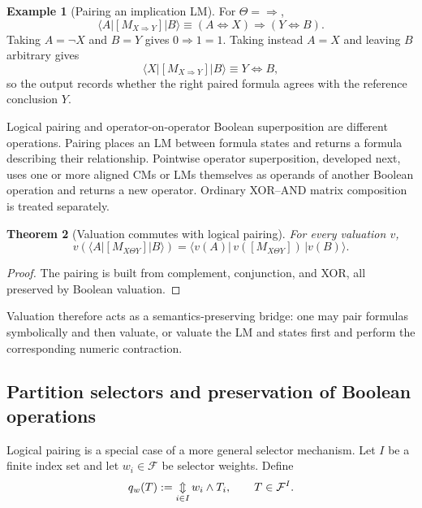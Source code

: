 \documentclass[11pt]{article}
\newtheorem{theorem}{Theorem}[section]
\theoremstyle{definition}
\newtheorem{example}[theorem]{Example}
\theoremstyle{remark}
\newcommand{\cF}{\mathcal F}
\newcommand{\bigxor}{\mathop{\Updownarrow}\displaylimits}
\begin{document}
\begin{example}[Pairing an implication LM]
For $\Theta=\Rightarrow$,
\[
 \langle A|[M_{X\Rightarrow Y}]|B\rangle
 \equiv (A\Leftrightarrow X)\Rightarrow(Y\Leftrightarrow B).
\]
Taking $A=\neg X$ and $B=Y$ gives $0\Rightarrow1=1$.  Taking instead $A=X$ and leaving $B$ arbitrary gives
\[
 \langle X|[M_{X\Rightarrow Y}]|B\rangle
 \equiv Y\Leftrightarrow B,
\]
so the output records whether the right paired formula agrees with the reference conclusion $Y$.
\end{example}

Logical pairing and operator-on-operator Boolean superposition are different operations.  Pairing places an LM between formula states and returns a formula describing their relationship.  Pointwise operator superposition, developed next, uses one or more aligned CMs or LMs themselves as operands of another Boolean operation and returns a new operator.  Ordinary XOR--AND matrix composition is treated separately.

\begin{theorem}[Valuation commutes with logical pairing]
For every valuation $v$,
\begin{equation}
 v\!\left(\langle A|[M_{X\Theta Y}]|B\rangle\right)
 =\langle v(A)|\,v([M_{X\Theta Y}])\,|v(B)\rangle.
 \label{eq:pairingcommutes}
\end{equation}
\end{theorem}
\begin{proof}
The pairing is built from complement, conjunction, and XOR, all preserved by Boolean valuation.
\end{proof}

Valuation therefore acts as a semantics-preserving bridge: one may pair formulas symbolically and then valuate, or valuate the LM and states first and perform the corresponding numeric contraction.

\subsection{Partition selectors and preservation of Boolean operations}

Logical pairing is a special case of a more general selector mechanism.  Let $I$ be a finite index set and let $w_i\in\cF$ be selector weights.  Define
\begin{equation}
 q_w(T):=\bigxor_{i\in I} w_i\land T_i,
 \qquad T\in\cF^I.
 \label{eq:selector}
\end{equation}
\end{document}
